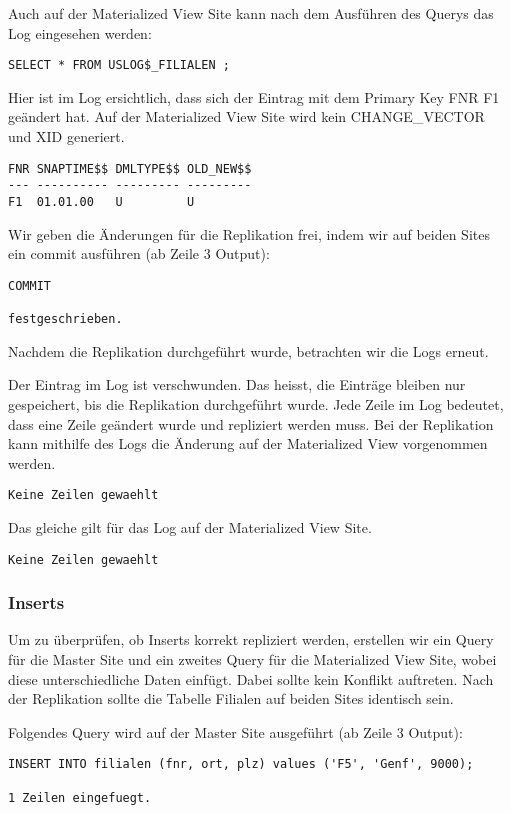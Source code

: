 \documentclass[11pt,a4paper,parskip=half]{scrartcl}
\begin{document}
Auch auf der Materialized View Site kann nach dem Ausführen des Querys das Log eingesehen werden:
\begin{lstlisting}
SELECT * FROM USLOG$_FILIALEN ;
\end{lstlisting}

Hier ist im Log ersichtlich, dass sich der Eintrag mit dem Primary Key FNR F1 geändert hat. Auf der Materialized View Site wird kein CHANGE\_VECTOR und XID generiert.
\begin{lstlisting}
FNR SNAPTIME$$ DMLTYPE$$ OLD_NEW$$
--- ---------- --------- ---------
F1  01.01.00   U         U         
\end{lstlisting}

Wir geben die Änderungen für die Replikation frei, indem wir auf beiden Sites ein commit ausführen (ab Zeile 3 Output):
\begin{lstlisting}
COMMIT

festgeschrieben.
\end{lstlisting}

Nachdem die Replikation durchgeführt wurde, betrachten wir die Logs erneut.

Der Eintrag im Log ist verschwunden. Das heisst, die Einträge bleiben nur gespeichert, bis die Replikation durchgeführt wurde. Jede Zeile im Log bedeutet, dass eine Zeile geändert wurde und repliziert werden muss. Bei der Replikation kann mithilfe des Logs die Änderung auf der Materialized View vorgenommen werden.
\begin{lstlisting}
Keine Zeilen gewaehlt
\end{lstlisting}

Das gleiche gilt für das Log auf der Materialized View Site.
\begin{lstlisting}
Keine Zeilen gewaehlt
\end{lstlisting}

\subsubsection{Inserts}
Um zu überprüfen, ob Inserts korrekt repliziert werden, erstellen wir ein Query für die Master Site und ein zweites Query für die Materialized View Site, wobei diese unterschiedliche Daten einfügt. Dabei sollte kein Konflikt auftreten. Nach der Replikation sollte die Tabelle Filialen auf beiden Sites identisch sein.

Folgendes Query wird auf der Master Site ausgeführt (ab Zeile 3 Output):
\begin{lstlisting}
INSERT INTO filialen (fnr, ort, plz) values ('F5', 'Genf', 9000);

1 Zeilen eingefuegt.
\end{lstlisting}
\end{document}
